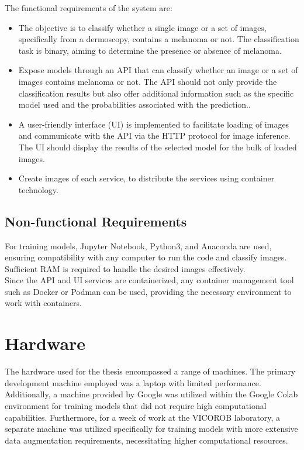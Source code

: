 The functional requirements of the system are:

\begin{itemize}
    \item The objective is to classify whether a single image or a set of images, specifically from a dermoscopy, contains a melanoma or not. The classification task is binary, aiming to determine the presence or absence of melanoma.

    \item Expose models through an API that can classify whether an image or a set of images contains melanoma or not. The API should not only provide the classification results but also offer additional information such as the specific model used and the probabilities associated with the prediction..

    \item A user-friendly interface (UI) is implemented to facilitate loading of images and communicate with the API via the HTTP protocol for image inference. The UI should display the results of the selected model for the bulk of loaded images.

    \item Create images of each service, to distribute the services using container technology.
\end{itemize}

\subsection{Non-functional Requirements}

For training models, Jupyter Notebook, Python3, and Anaconda are used, ensuring compatibility with any computer to run the code and classify images. Sufficient RAM is required to handle the desired images effectively. \\

Since the API and UI services are containerized, any container management tool such as Docker or Podman can be used, providing the necessary environment to work with containers.

\newpage

\section{Hardware}

The hardware used for the thesis encompassed a range of machines. The primary development machine employed was a laptop with limited performance. Additionally, a machine provided by Google was utilized within the Google Colab environment for training models that did not require high computational capabilities. Furthermore, for a week of work at the VICOROB laboratory, a separate machine was utilized specifically for training models with more extensive data augmentation requirements, necessitating higher computational resources. \\

